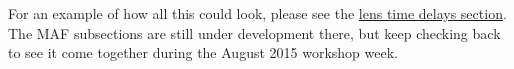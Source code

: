 For an example of how all this could look, please see the
\hyperref[sec:lenstimedelays]{lens
time delays section}. The MAF subsections are still under development
there, but keep checking back to see it come together during the
August 2015 workshop week.


\navigationbar

